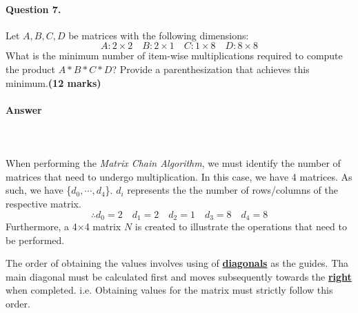 \documentclass[12pt]{article}
\begin{document}
\paragraph{Question 7.} Let $A,B,C,D$ be matrices with the following dimensions:
\begin{equation*}
A:2\times 2\quad B:2\times 1\quad C:1\times 8\quad D:8\times 8 
\end{equation*}
What is the minimum number of item-wise multiplications required to compute the product $A\ast B\ast C\ast D$? Provide a parenthesization that achieves this minimum.\hfill {\bf (12 marks)}
\paragraph{Answer}\mbox{}\\\\When performing the \textit{Matrix Chain Algorithm}, we must identify the number of matrices that need to undergo multiplication. In this case, we have 4 matrices. As such, we have \{$d_0,\cdots,d_4$\}. $d_i$ represents the the number of rows/columns of the respective matrix.
\begin{equation*}
\therefore d_0=2\quad d_1=2\quad d_2=1\quad d_3=8\quad d_4=8
\end{equation*} Furthermore, a 4$\times$4 matrix $N$ is created to illustrate the operations that need to be performed.
\begin{figure}[H]
\centering
{}
\end{figure}
\noindent
The order of obtaining the values involves using of \textbf{\underline{diagonals}} as the guides. Tha main diagonal must be calculated first and moves subsequently towards the \textbf{\underline{right}} when completed. i.e. Obtaining values for the matrix must strictly follow this order.
\end{document}
